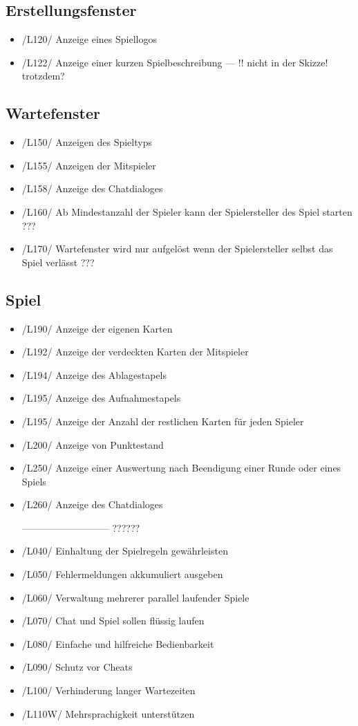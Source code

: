 \documentclass{article}
\begin{document}
\subsection{Erstellungsfenster}
\begin{itemize}
	\item /L120/ Anzeige eines Spiellogos
	\item /L122/ Anzeige einer kurzen Spielbeschreibung --- !! nicht in der Skizze! trotzdem?
\end{itemize}

\subsection{Wartefenster}
\begin{itemize}
	\item /L150/ Anzeigen des Spieltyps
	\item /L155/ Anzeigen der Mitspieler
	\item /L158/ Anzeige des Chatdialoges
	\item /L160/ Ab Mindestanzahl der Spieler kann der Spielersteller des Spiel starten ???
	\item /L170/ \gls{Wartefenster} wird nur aufgelöst wenn der Spielersteller selbst das Spiel verlässt ???
\end{itemize}

\subsection{Spiel}
\begin{itemize}
	\item /L190/ Anzeige der eigenen Karten
	\item /L192/ Anzeige der verdeckten Karten der Mitspieler
	\item /L194/ Anzeige des Ablagestapels
	\item /L195/ Anzeige des Aufnahmestapels
	\item /L195/ Anzeige der Anzahl der restlichen Karten für jeden Spieler
	\item /L200/ Anzeige von Punktestand
	\item /L250/ Anzeige einer Auswertung nach Beendigung einer Runde oder eines Spiels
	\item /L260/ Anzeige des Chatdialoges

---------------------------
	??????
	\item /L040/ Einhaltung der Spielregeln gewährleisten
	\item /L050/ Fehlermeldungen akkumuliert ausgeben
	\item /L060/ Verwaltung mehrerer parallel laufender Spiele
	\item /L070/ Chat und Spiel sollen flüssig laufen
	\item /L080/ Einfache und hilfreiche Bedienbarkeit
	\item /L090/ Schutz vor Cheats
	\item /L100/ Verhinderung langer Wartezeiten
	\item /L110W/ Mehrsprachigkeit unterstützen
\end{itemize}
\end{document}
